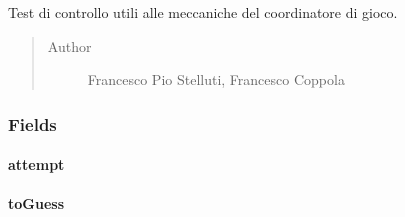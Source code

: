 \documentclass[letterpaper,10pt,italian,openany,oneside]{sphinxmanual}
\begin{document}
\begin{fulllineitems}
\label{\detokenize{test/it/unicam/cs/pa/mastermind/test/GameCoreBoardControllerTest:it.unicam.cs.pa.mastermind.test.GameCoreBoardControllerTest}}
Test di controllo utili alle meccaniche del coordinatore di gioco.
\begin{quote}\begin{description}
\item[{Author}] \leavevmode
Francesco Pio Stelluti, Francesco Coppola

\end{description}\end{quote}

\end{fulllineitems}



\subsubsection{Fields}
\label{\detokenize{test/it/unicam/cs/pa/mastermind/test/GameCoreBoardControllerTest:fields}}

\paragraph{attempt}
\label{\detokenize{test/it/unicam/cs/pa/mastermind/test/GameCoreBoardControllerTest:attempt}}

\begin{fulllineitems}
\label{\detokenize{test/it/unicam/cs/pa/mastermind/test/GameCoreBoardControllerTest:it.unicam.cs.pa.mastermind.test.GameCoreBoardControllerTest.attempt}}
\end{fulllineitems}



\paragraph{toGuess}
\label{\detokenize{test/it/unicam/cs/pa/mastermind/test/GameCoreBoardControllerTest:toguess}}

\begin{fulllineitems}
\label{\detokenize{test/it/unicam/cs/pa/mastermind/test/GameCoreBoardControllerTest:it.unicam.cs.pa.mastermind.test.GameCoreBoardControllerTest.toGuess}}
\end{fulllineitems}
\end{document}
